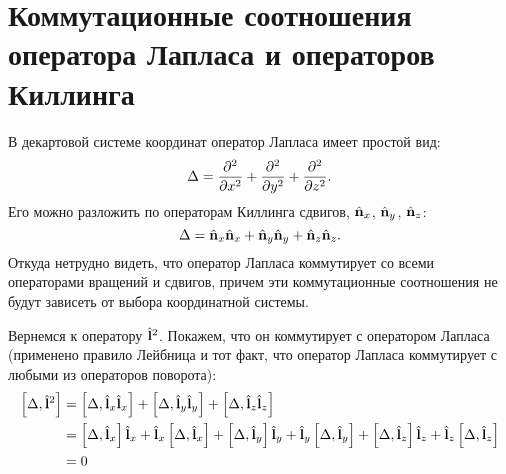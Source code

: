 \documentclass[12pt,a4paper]{article}
\begin{document}

    \section{Коммутационные соотношения оператора Лапласа и операторов Киллинга}

        В декартовой системе координат оператор Лапласа имеет простой вид:
        \begin{equation}
            \Delta = \pdv[2]{x} + \pdv[2]{y} + \pdv[2]{z} .
        \end{equation}
        Его можно разложить по операторам Киллинга сдвигов, $\hat{\mathbf{n}}_x$, $\hat{\mathbf{n}}_y$, $\hat{\mathbf{n}}_z$:
        \begin{equation}
            \Delta = \hat{\mathbf{n}}_x\hat{\mathbf{n}}_x + \hat{\mathbf{n}}_y\hat{\mathbf{n}}_y + \hat{\mathbf{n}}_z\hat{\mathbf{n}}_z .
        \end{equation}
        Откуда нетрудно видеть, что оператор Лапласа коммутирует со всеми операторами вращений и сдвигов, причем эти коммутационные соотношения не будут зависеть от выбора координатной системы.

        Вернемся к оператору $\hat{\mathbf{l}}^2$. Покажем, что он коммутирует с оператором Лапласа (применено правило Лейбница и тот факт, что оператор Лапласа коммутирует с любыми из операторов поворота):
        \begin{equation}\begin{aligned}
            \left[ \Delta, \hat{\mathbf{l}}^2 \right]
                &= \left[ \Delta, \hat{\mathbf{l}}_x \hat{\mathbf{l}}_x \right]
                    + \left[ \Delta, \hat{\mathbf{l}}_y \hat{\mathbf{l}}_y \right]
                    + \left[ \Delta, \hat{\mathbf{l}}_z \hat{\mathbf{l}}_z \right] \\
                &= \left[ \Delta, \hat{\mathbf{l}}_x \right] \hat{\mathbf{l}}_x
                    + \hat{\mathbf{l}}_x \left[ \Delta, \hat{\mathbf{l}}_x \right]
                    + \left[ \Delta, \hat{\mathbf{l}}_y \right] \hat{\mathbf{l}}_y
                    + \hat{\mathbf{l}}_y \left[ \Delta, \hat{\mathbf{l}}_y \right]
                    + \left[ \Delta, \hat{\mathbf{l}}_z \right] \hat{\mathbf{l}}_z
                    + \hat{\mathbf{l}}_z \left[ \Delta, \hat{\mathbf{l}}_z \right] \\
                &= 0
        \end{aligned}\end{equation}
\end{document}
